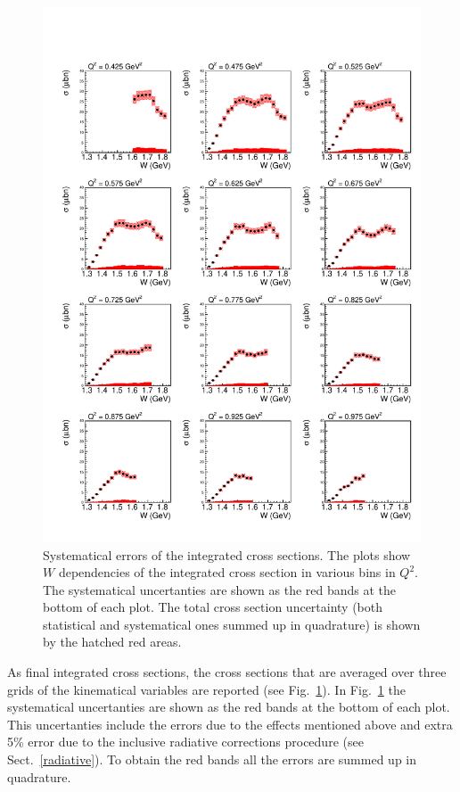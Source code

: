 \begin{figure}[htp]
\begin{center}
\includegraphics[width=15cm]{pictures/sys_err/sys_err.pdf}
\caption{\small Systematical errors of the integrated cross sections. The plots show $W$ dependencies of the integrated cross section in various bins in $Q^{2}$. The systematical uncertanties are shown as the red bands at the bottom of each plot. The total cross section uncertainty (both statistical and systematical ones summed up in quadrature) is shown by the hatched red areas.}
\label{fig:sys_err}

\end{center}
\end{figure}

As final integrated cross sections, the cross sections that are averaged over three grids of the kinematical variables are reported (see Fig.~\ref{fig:sys_err}). In Fig.~\ref{fig:sys_err} the systematical uncertanties are shown as the red bands at the bottom of each plot. This uncertanties include the errors due to the effects mentioned above and extra 5\% error due to the inclusive radiative corrections procedure (see Sect.~\ref{radiative}). To obtain the red bands all the errors are summed up in quadrature.  

